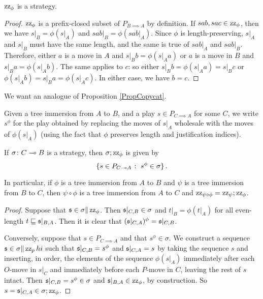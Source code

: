 \documentclass[11pt]{report}
\begin{document}
\begin{proposition}
  $\operatorname{zz}_\phi$ is a strategy.  
\end{proposition}
\begin{proof}
  $\operatorname{zz}_\phi$ is a prefix-closed subset of $P_{B\implies A}$ by definition.  
  If $sab,sac\in\operatorname{zz}_\phi$, then we have $s\vert_B=\phi(s\vert_A)$ and $sab\vert_B=\phi(sab\vert_A)$.
  Since $\phi$ is length-preserving, $s\vert_A$ and $s\vert_B$ must have the same length, and the same is true of $sab\vert_A$ and $sab\vert_B$.  
  Therefore, either $a$ is a move in $A$ and $s\vert_Bb=\phi(s\vert_Aa)$ or $a$ is a move in $B$ and $s\vert_Ba=\phi(s\vert_Ab)$.  
  The same applies to $c$: so either $s\vert_Bb=\phi(s\vert_Aa)=s\vert_Bc$ or $\phi(s\vert_Ab)=s\vert_Ba=\phi(s\vert_Ac)$.  
  In either case, we have $b=c$.
\end{proof}

We want an analogue of Proposition \ref{PropCopycat}.

\begin{definition}
  Given a tree immersion from $A$ to $B$, and a play $s\in P_{C\implies A}$ for some $C$, we write $s^\phi$ for the play obtained by replacing the moves of $s\vert_A$ wholesale with the moves of $\phi(s\vert_A)$ (using the fact that $\phi$ preserves length and justification indices).
\end{definition}

\begin{proposition}
  If $\sigma\colon C \multimap B$ is a strategy, then $\sigma;\operatorname{zz}_\phi$ is given by
  \[
    \{s\in P_{C\multimap A}\;\colon\; s^\phi\in\sigma\}\,.
    \]

  In particular, if $\phi$ is a tree immersion from $A$ to $B$ and $\psi$ is a tree immersion from $B$ to $C$, then $\psi\circ\phi$ is a tree immersion from $A$ to $C$ and $\operatorname{zz}_{\psi\circ\phi}=\operatorname{zz}_\psi;\operatorname{zz}_\phi$.
  \label{PropTree}
\end{proposition}
\begin{proof}
  Suppose that $\mathfrak s\in\sigma\|\operatorname{zz}_\phi$.  
  Then $\mathfrak s\vert_{C,B}\in\sigma$ and $t\vert_B=\phi(t\vert_A)$ for all even-length $t\sqsubseteq \mathfrak s\vert_{B,A}$.  
  Then it is clear that $(\mathfrak s\vert_{C,A})^\phi=\mathfrak s\vert_{C,B}$.  

  Conversely, suppose that $s\in P_{C\implies A}$ and that $s^\phi\in\sigma$.  
  We construct a sequence $\mathfrak s\in\sigma\|\operatorname{zz}_phi$ such that $\mathfrak s\vert_{C,B}=s^\phi$ and $\mathfrak s\vert_{C,A}=s$ by taking the sequence $s$ and inserting, in order, the elements of the sequence $\phi(s\vert_A)$ immediately after each $O$-move in $s\vert_C$ and immediately before each $P$-move in $C$, leaving the rest of $s$ intact.  
  Then $\mathfrak s\vert_{C,B}=s^\phi\in\sigma$ and $\mathfrak s\vert_{B,A}\in\operatorname{zz}_\phi$, by construction.  
  So $s=\mathfrak s\vert_{C,A}\in \sigma;\operatorname{zz}_\phi$.
\end{proof}
\end{document}
